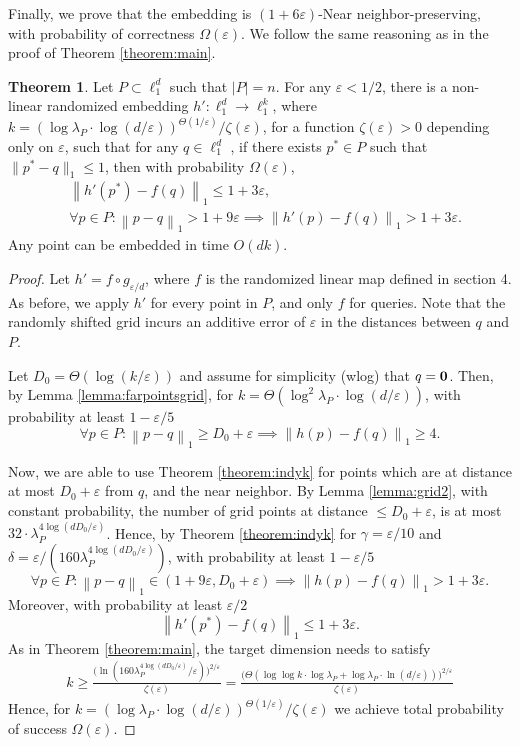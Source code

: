 \documentclass[10pt,a4paper,twoside]{book}
\newcommand{\mbf}[1]{\mbox{\boldmath$\rm{#1}$}}
\newcommand{\eps}{\varepsilon}
\newcommand{\norm}[1]{\left \rVert {#1} \right \rVert}
\theoremstyle{definition}
\newtheorem{theorem}[definition]{Theorem}
\theoremstyle{remark}
\begin{document}
Finally, we prove that the embedding is $(1{+}6\eps)$-Near neighbor-preserving, with probability of correctness $\Omega(\eps)$. We follow the same reasoning as in the proof of Theorem \ref{theorem:main}.
\begin{theorem}
\label{theorem:second}
Let $P\subset \ell_1^d$ such that $|P|=n$. 
For any $\eps < 1/2$, there is a non-linear randomized embedding $h': \ell_1^d \rightarrow \ell_1^k$, where $k = \left( \log{\lambda_P} \cdot \log(d / \eps) \right)^{\Theta(1/\eps)} / \zeta(\eps)$, for a function $\zeta(\eps)>0$ depending only on $\eps$, such that for any  $q \in \ell_1^d$ , if there exists $p^{*}\in P$ such that $\|p^{*}-q\|_1 \leq 1$, then with probability $\Omega(\eps)$,
\begin{align*}
    &\norm{h'(p^{*}) - f(q)}_1 \leq 1 + 3\eps, \\
    &\forall p\in P: \norm{p-q}_1 > 1+9\eps \implies \norm{h'(p) - f(q)}_1 > 1 + 3\eps.
\end{align*}
Any point can be embedded in time $O(dk)$.
\end{theorem}

\begin{proof}
Let $h' = f \circ g_{\eps/d}$, where $f$ is the randomized linear map defined in section 4. As before, we apply $h'$ for every point in $P$, and only $f$ for queries. Note that the randomly shifted grid incurs an additive error of $\eps$ in the distances between $q$ and $P$.

Let $D_0 = \Theta(\log (k/\eps))$ and assume for simplicity (wlog) that $q=\mbf{0}$. Then, by Lemma \ref{lemma:farpointsgrid}, for $k = \Theta \left( \log^{2}{\lambda_P} \cdot \log (d / \eps)  \right)$, with probability at least $1- \eps/5$
\begin{equation*}
    \forall p \in P : \norm{p-q}_1 \geq D_0 + \eps \implies \norm{h(p) - f(q)}_1 \geq 4.
\end{equation*}

Now, we are able to use Theorem \ref{theorem:indyk} for points which are at distance at most $D_0 + \eps$ from $q$, and the near neighbor. By Lemma \ref{lemma:grid2}, with constant probability, the number of grid points at distance $\leq D_0 + \eps$, is at most $32\cdot \lambda_P^{4 \log (dD_0/\eps)}$. Hence, by Theorem \ref{theorem:indyk} for $\gamma = \eps/10$ and $\delta = \eps/ (160\lambda_P^{4\log{(d D_0 / \eps)}})$, with probability at least $1-\eps/5$
\[ \forall p\in P: \norm{p-q}_1 \in (1+9\eps, D_0+ \eps)  \implies \norm{h(p) - f(q)}_1 > 1 + 3\eps. \]
Moreover, with probability at least $\eps/2$
\[
\norm{h'(p^*) - f(q)}_1 \leq 1 + 3\eps.
\]
As in Theorem \ref{theorem:main}, the target dimension needs to satisfy
\begin{align*}
    k \geq \frac{\big( \ln{ ( 160\lambda_P^{4\log{(d D_0 / \eps)}} / \eps ) } \big) ^{2/\eps}}{ \zeta(\eps)} = \frac{\big( \Theta ( \log \log k  \cdot \log{\lambda_P} + \log{\lambda_P} \cdot \ln(d / \eps) ) \big) ^{2/\eps}}{ \zeta(\eps)}
\end{align*}
Hence, for $k = \left( \log{\lambda_P} \cdot \log(d / \eps) \right)^{\Theta(1/\eps)} / \zeta(\eps) $ we achieve total probability of success $\Omega(\eps)$.
\end{proof}
\end{document}
